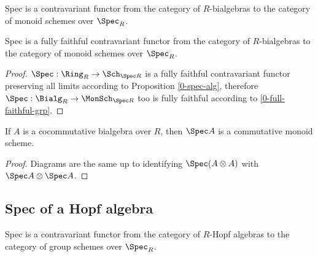 \begin{definition}
  \label{0-spec-bialg}
  \leanok

  Spec is a contravariant functor from the category of $R$-bialgebras
  to the category of monoid schemes over $\Spec_R$.
\end{definition}


\begin{proposition}
  \label{0-full-faithful-spec-bialg}
  \leanok

  Spec is a fully faithful contravariant functor from the category of $R$-bialgebras
  to the category of monoid schemes over $\Spec_R$.
\end{proposition}
\begin{proof}
  \leanok

  $\Spec : \Ring_R \to \Sch_{\Spec R}$ is a fully faithful contravariant functor
  preserving all limits according to Proposition \ref{0-spec-alg},
  therefore $\Spec : \Bialg_R \to \MonSch_{\Spec R}$ too is fully faithful
  according to \ref{0-full-faithful-grp}.
\end{proof}


\begin{proposition}
  \label{0-spec-cocomm-bialg}
  \leanok

  If $A$ is a cocommutative bialgebra over $R$, then $\Spec A$ is a commutative monoid scheme.
\end{proposition}
\begin{proof}
  \uses{}
  \leanok

  Diagrams are the same up to identifying $\Spec (A \otimes A)$ with $\Spec A \otimes \Spec A$.
\end{proof}


\subsection{Spec of a Hopf algebra}


\begin{definition}
  \label{0-spec-hopf}
  \leanok

  Spec is a contravariant functor from the category of $R$-Hopf algebras to the category of group schemes over $\Spec_R$.
\end{definition}


